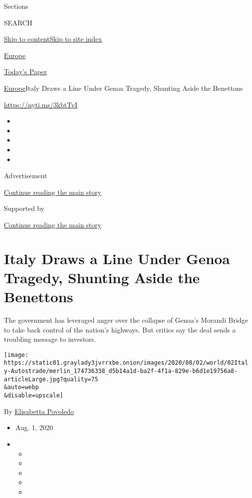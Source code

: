 Sections

SEARCH

\protect\hyperlink{site-content}{Skip to
content}\protect\hyperlink{site-index}{Skip to site index}

\href{https://www.nytimes3xbfgragh.onion/section/world/europe}{Europe}

\href{https://myaccount.nytimes3xbfgragh.onion/auth/login?response_type=cookie\&client_id=vi}{}

\href{https://www.nytimes3xbfgragh.onion/section/todayspaper}{Today's
Paper}

\href{/section/world/europe}{Europe}\textbar{}Italy Draws a Line Under
Genoa Tragedy, Shunting Aside the Benettons

\url{https://nyti.ms/3kbtTvI}

\begin{itemize}
\item
\item
\item
\item
\item
\end{itemize}

Advertisement

\protect\hyperlink{after-top}{Continue reading the main story}

Supported by

\protect\hyperlink{after-sponsor}{Continue reading the main story}

\hypertarget{italy-draws-a-line-under-genoa-tragedy-shunting-aside-the-benettons}{%
\section{Italy Draws a Line Under Genoa Tragedy, Shunting Aside the
Benettons}\label{italy-draws-a-line-under-genoa-tragedy-shunting-aside-the-benettons}}

The government has leveraged anger over the collapse of Genoa's Morandi
Bridge to take back control of the nation's highways. But critics say
the deal sends a troubling message to investors.

\texttt{[image: https://static01.graylady3jvrrxbe.onion/images/2020/08/02/world/02Italy-Autostrade/merlin\_174736338\_d5b14a1d-ba2f-4f1a-829e-b6d1e19756a8-articleLarge.jpg?quality=75\\\&auto=webp\\\&disable=upscale]}

By
\href{https://www.nytimes3xbfgragh.onion/by/elisabetta-povoledo}{Elisabetta
Povoledo}

\begin{itemize}
\item
  Aug. 1, 2020
\item
  \begin{itemize}
  \item
  \item
  \item
  \item
  \item
  \end{itemize}
\end{itemize}


